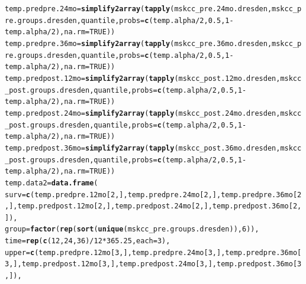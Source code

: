 \documentclass{article}\usepackage[]{graphicx}\usepackage[]{color}
\makeatletter
\newcommand{\hlnum}[1]{\textcolor[rgb]{0.686,0.059,0.569}{#1}}%
\newcommand{\hlopt}[1]{\textcolor[rgb]{0,0,0}{#1}}%
\newcommand{\hlstd}[1]{\textcolor[rgb]{0.345,0.345,0.345}{#1}}%
\newcommand{\hlkwb}[1]{\textcolor[rgb]{0.69,0.353,0.396}{#1}}%
\newcommand{\hlkwc}[1]{\textcolor[rgb]{0.333,0.667,0.333}{#1}}%
\newcommand{\hlkwd}[1]{\textcolor[rgb]{0.737,0.353,0.396}{\textbf{#1}}}%
\newenvironment{kframe}{%
 \def\at@end@of@kframe{}%
 \ifinner\ifhmode%
  \def\at@end@of@kframe{\end{minipage}}%
  \begin{minipage}{\columnwidth}%
 \fi\fi%
 \def\FrameCommand##1{\hskip\@totalleftmargin \hskip-\fboxsep
 \colorbox{shadecolor}{##1}\hskip-\fboxsep
     \hskip-\linewidth \hskip-\@totalleftmargin \hskip\columnwidth}%
 \MakeFramed {\advance\hsize-\width
   \@totalleftmargin\z@ \linewidth\hsize
   \@setminipage}}%
 {\par\unskip\endMakeFramed%
 \at@end@of@kframe}
\newenvironment{knitrout}{}{} %
\makeatother
\begin{document}
\begin{knitrout}
\begin{kframe}
\begin{alltt}
\hlstd{temp.predpre.24mo} \hlkwb{=} \hlkwd{simplify2array}\hlstd{(}\hlkwd{tapply}\hlstd{(mskcc_pre.24mo.dresden, mskcc_pre.groups.dresden, quantile,} \hlkwc{probs} \hlstd{=} \hlkwd{c}\hlstd{(temp.alpha}\hlopt{/}\hlnum{2}\hlstd{,} \hlnum{0.5}\hlstd{,} \hlnum{1}\hlopt{-}\hlstd{temp.alpha}\hlopt{/}\hlnum{2}\hlstd{),} \hlkwc{na.rm} \hlstd{=} \hlnum{TRUE}\hlstd{))}
\hlstd{temp.predpre.36mo} \hlkwb{=} \hlkwd{simplify2array}\hlstd{(}\hlkwd{tapply}\hlstd{(mskcc_pre.36mo.dresden, mskcc_pre.groups.dresden, quantile,} \hlkwc{probs} \hlstd{=} \hlkwd{c}\hlstd{(temp.alpha}\hlopt{/}\hlnum{2}\hlstd{,} \hlnum{0.5}\hlstd{,} \hlnum{1}\hlopt{-}\hlstd{temp.alpha}\hlopt{/}\hlnum{2}\hlstd{),} \hlkwc{na.rm} \hlstd{=} \hlnum{TRUE}\hlstd{))}
\hlstd{temp.predpost.12mo} \hlkwb{=} \hlkwd{simplify2array}\hlstd{(}\hlkwd{tapply}\hlstd{(mskcc_post.12mo.dresden, mskcc_post.groups.dresden, quantile,} \hlkwc{probs} \hlstd{=} \hlkwd{c}\hlstd{(temp.alpha}\hlopt{/}\hlnum{2}\hlstd{,} \hlnum{0.5}\hlstd{,} \hlnum{1}\hlopt{-}\hlstd{temp.alpha}\hlopt{/}\hlnum{2}\hlstd{),} \hlkwc{na.rm} \hlstd{=} \hlnum{TRUE}\hlstd{))}
\hlstd{temp.predpost.24mo} \hlkwb{=} \hlkwd{simplify2array}\hlstd{(}\hlkwd{tapply}\hlstd{(mskcc_post.24mo.dresden, mskcc_post.groups.dresden, quantile,} \hlkwc{probs} \hlstd{=} \hlkwd{c}\hlstd{(temp.alpha}\hlopt{/}\hlnum{2}\hlstd{,} \hlnum{0.5}\hlstd{,} \hlnum{1}\hlopt{-}\hlstd{temp.alpha}\hlopt{/}\hlnum{2}\hlstd{),} \hlkwc{na.rm} \hlstd{=} \hlnum{TRUE}\hlstd{))}
\hlstd{temp.predpost.36mo} \hlkwb{=} \hlkwd{simplify2array}\hlstd{(}\hlkwd{tapply}\hlstd{(mskcc_post.36mo.dresden, mskcc_post.groups.dresden, quantile,} \hlkwc{probs} \hlstd{=} \hlkwd{c}\hlstd{(temp.alpha}\hlopt{/}\hlnum{2}\hlstd{,} \hlnum{0.5}\hlstd{,} \hlnum{1}\hlopt{-}\hlstd{temp.alpha}\hlopt{/}\hlnum{2}\hlstd{),} \hlkwc{na.rm} \hlstd{=} \hlnum{TRUE}\hlstd{))}
\hlstd{temp.data2} \hlkwb{=} \hlkwd{data.frame}\hlstd{(}
        \hlkwc{surv} \hlstd{=} \hlkwd{c}\hlstd{(temp.predpre.12mo[}\hlnum{2}\hlstd{,], temp.predpre.24mo[}\hlnum{2}\hlstd{,], temp.predpre.36mo[}\hlnum{2}\hlstd{,], temp.predpost.12mo[}\hlnum{2}\hlstd{,], temp.predpost.24mo[}\hlnum{2}\hlstd{,], temp.predpost.36mo[}\hlnum{2}\hlstd{,]),}
        \hlkwc{group} \hlstd{=} \hlkwd{factor}\hlstd{(}\hlkwd{rep}\hlstd{(}\hlkwd{sort}\hlstd{(}\hlkwd{unique}\hlstd{(mskcc_pre.groups.dresden)),} \hlnum{6}\hlstd{)),}
        \hlkwc{time} \hlstd{=} \hlkwd{rep}\hlstd{(}\hlkwd{c}\hlstd{(}\hlnum{12}\hlstd{,} \hlnum{24}\hlstd{,} \hlnum{36}\hlstd{)}\hlopt{/}\hlnum{12}\hlopt{*}\hlnum{365.25}\hlstd{,} \hlkwc{each} \hlstd{=} \hlnum{3}\hlstd{),}
        \hlkwc{upper} \hlstd{=} \hlkwd{c}\hlstd{(temp.predpre.12mo[}\hlnum{3}\hlstd{,], temp.predpre.24mo[}\hlnum{3}\hlstd{,], temp.predpre.36mo[}\hlnum{3}\hlstd{,], temp.predpost.12mo[}\hlnum{3}\hlstd{,], temp.predpost.24mo[}\hlnum{3}\hlstd{,], temp.predpost.36mo[}\hlnum{3}\hlstd{,]),}

\end{alltt}
\end{kframe}
\end{knitrout}
\end{document}
